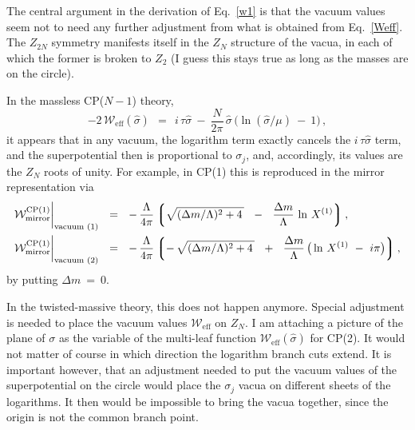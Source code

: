 \documentclass[12pt]{article}
\def\beq{\begin{equation}}
\def\eeq{\end{equation}}
\newcommand{\mc}[1]{\mathcal{#1}}
\newcommand{\lgr}{\left\lgroup}
\newcommand{\rgr}{\right\rgroup}
\newcommand{\hsigma}{{\hat{\sigma}}}
\begin{document}
	The central argument in the derivation of Eq.~\eqref{w1} is that the vacuum values
	seem not to need any further adjustment from what is obtained from Eq.~\eqref{Weff}.
	The $ Z_{2N} $ symmetry manifests itself in the $ Z_N $ structure of the vacua, in each of which
	the former is broken to $ Z_2 $ (I guess this stays true as long as the masses are
	on the circle).

	In the massless CP($N-1$) theory, 
\beq
	-2\, \mc{W}_\text{eff} (\hsigma) ~~=~~ i\, \tau\hsigma ~-~ 
		\frac{N}{2\pi}\, \hsigma \, 
				      \big( \ln (\hsigma/\mu) ~-~ 1 \big)\,,
\eeq
	it appears that in any vacuum, the logarithm term exactly cancels the $ i\, \tau\hsigma $ term, 
	and the superpotential then is proportional to $ \sigma_j $, and, 
	accordingly, its values are the $ Z_N $ roots of unity.
	For example, in CP(1) this is reproduced in the mirror representation via
\begin{align}
%
\label{mirrvv}
	\mc{W}_\text{mirror}^\text{CP(1)}\bigg|_\text{vacuum (1)} & ~~=~~
		-\, \frac{\Lambda}{4\pi} 
			\lgr \sqrt{ (\Delta m / \Lambda)^2 + 4\, } ~~-~~ \frac{\Delta m}{\Lambda}\, \ln\, X^{(1)} \rgr,
	\\
%
\notag
	\mc{W}_\text{mirror}^\text{CP(1)}\bigg|_\text{vacuum (2)} & ~~=~~
		-\, \frac{\Lambda}{4\pi}
			\lgr -\, \sqrt{ (\Delta m / \Lambda)^2 + 4\, } ~~+~~ 
			 \frac{\Delta m}{\Lambda}\, \big(\ln\, X^{(1)} ~-~ i\pi \big) \rgr ,
\end{align}
	by putting $ \Delta m ~=~ 0 $.

	In the twisted-massive theory, this does not happen anymore. 
	Special adjustment is needed to place the vacuum values $ \mc{W}_\text{eff} $ on $ Z_N $.
	I am attaching a picture of the plane of $ \sigma $ as the variable of 
	the multi-leaf function $ \mc{W}_\text{eff}(\hsigma) $ for CP(2).
	It would not matter of course in which direction the logarithm branch cuts extend. 
	It is important however, that an adjustment needed to put the vacuum values of the
	superpotential on the circle would place the $ \sigma_j $ vacua on 
	different sheets of the logarithms.
	It then would be impossible to bring the vacua together, since the origin is not the 
	common branch point. 
\end{document}
